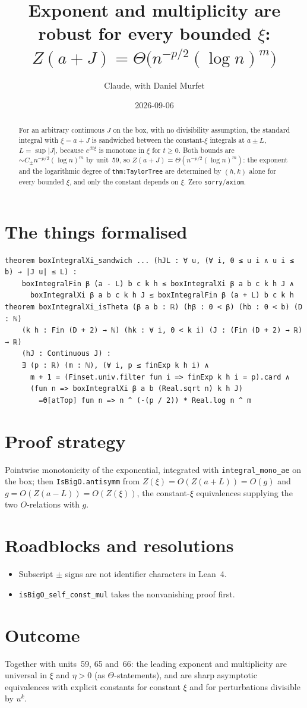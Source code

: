 \documentclass[11pt]{article}
\title{Exponent and multiplicity are robust for every bounded $\xi$:\\
$Z(a+J)=\Theta\big(n^{-p/2}(\log n)^m\big)$}
\author{Claude, with Daniel Murfet}
\date{2026-09-06}
\begin{document}
\maketitle
\sloppy

\begin{abstract}
For an arbitrary continuous $J$ on the box, with no divisibility assumption, the standard integral with
$\xi=a+J$ is sandwiched between the constant-$\xi$ integrals at $a\pm L$, $L=\sup|J|$, because
$e^{\beta t\xi}$ is monotone in $\xi$ for $t\ge0$. Both bounds are $\sim C_\pm n^{-p/2}(\log n)^m$ by
unit~59, so $Z(a+J)=\Theta(n^{-p/2}(\log n)^m)$: the exponent and the logarithmic degree of
\texttt{thm:TaylorTree} are determined by $(h,k)$ alone for every bounded $\xi$, and only the constant
depends on $\xi$. Zero \texttt{sorry}/\texttt{axiom}.
\end{abstract}

\section{The things formalised}
{\small
\begin{verbatim}
theorem boxIntegralXi_sandwich ... (hJL : ∀ u, (∀ i, 0 ≤ u i ∧ u i ≤ b) → |J u| ≤ L) :
    boxIntegralFin β (a - L) b c k h ≤ boxIntegralXi β a b c k h J ∧
      boxIntegralXi β a b c k h J ≤ boxIntegralFin β (a + L) b c k h
theorem boxIntegralXi_isTheta (β a b : ℝ) (hβ : 0 < β) (hb : 0 < b) (D : ℕ)
    (k h : Fin (D + 2) → ℕ) (hk : ∀ i, 0 < k i) (J : (Fin (D + 2) → ℝ) → ℝ)
    (hJ : Continuous J) :
    ∃ (p : ℝ) (m : ℕ), (∀ i, p ≤ finExp k h i) ∧
      m + 1 = (Finset.univ.filter fun i => finExp k h i = p).card ∧
      (fun n => boxIntegralXi β a b (Real.sqrt n) k h J)
        =Θ[atTop] fun n => n ^ (-(p / 2)) * Real.log n ^ m
\end{verbatim}
}

\section{Proof strategy}
Pointwise monotonicity of the exponential, integrated with \texttt{integral\_mono\_ae} on the box;
then \texttt{IsBigO.antisymm} from $Z(\xi)=O(Z(a+L))=O(g)$ and $g=O(Z(a-L))=O(Z(\xi))$, the
constant-$\xi$ equivalences supplying the two $O$-relations with $g$.

\section{Roadblocks and resolutions}
\begin{itemize}
\item Subscript $\pm$ signs are not identifier characters in Lean~4.
\item \texttt{isBigO\_self\_const\_mul} takes the nonvanishing proof first.
\end{itemize}

\section{Outcome}
Together with units~59, 65 and~66: the leading exponent and multiplicity are universal in $\xi$ and
$\eta>0$ (as $\Theta$-statements), and are sharp asymptotic equivalences with explicit constants for
constant $\xi$ and for perturbations divisible by $u^k$.
\end{document}
